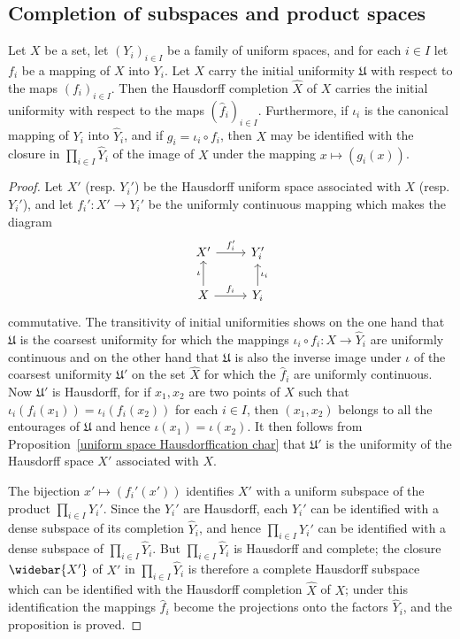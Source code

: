 \subsection{Completion of subspaces and product spaces}
\begin{proposition}\label{uniform space completion of initial topology}
Let $X$ be a set, let $(Y_i)_{i\in I}$ be a family of uniform spaces, and for each $i\in I$ let $f_i$ be a mapping of $X$ into $Y_i$. Let $X$ carry the initial uniformity $\mathfrak{U}$ with respect to the maps $(f_i)_{i\in I}$. Then the Hausdorff completion $\widehat{X}$ of $X$ carries the initial uniformity with respect to the maps $(\hat{f}_i)_{i\in I}$. Furthermore, if $\iota_i$ is the canonical mapping of $Y_i$ into $\widehat{Y}_i$, and if $g_i=\iota_i\circ f_i$, then $X$ may be identified with the closure in $\prod_{i\in I}\widehat{Y}_i$ of the image of $X$ under the mapping $x\mapsto(g_i(x))$.
\end{proposition}
\begin{proof}
Let $X'$ (resp. $Y_i'$) be the Hausdorff uniform space associated with $X$ (resp. $Y_i'$), and let $f_i':X'\to Y_i'$ be the uniformly continuous mapping which makes the diagram
\[\begin{tikzcd}
X'\ar[r,"f_i'"]&Y_i'\\
X\ar[u,"\iota"]\ar[r,"f_i"]&Y_i\ar[u,swap,"\iota_i"]
\end{tikzcd}\]
commutative. The transitivity of initial uniformities shows on the one hand that $\mathfrak{U}$ is the coarsest uniformity for which the mappings $\iota_i\circ f_i:X\to\widehat{Y}_i$ are uniformly continuous and on the other hand that $\mathfrak{U}$ is also the inverse image under $\iota$ of the coarsest uniformity $\mathfrak{U}'$ on the set $\widehat{X}$ for which the $\hat{f}_i$ are uniformly continuous. Now $\mathfrak{U}'$ is Hausdorff, for if $x_1,x_2$ are two points of $X$ such that $\iota_i(f_i(x_1))=\iota_i(f_i(x_2))$ for each $i\in I$, then $(x_1,x_2)$ belongs to all the entourages of $\mathfrak{U}$ and hence $\iota(x_1)=\iota(x_2)$. It then follows from Proposition~\ref{uniform space Hausdorffication char} that $\mathfrak{U}'$ is the uniformity of the Hausdorff space $X'$ associated with $X$.\par
The bijection $x'\mapsto(f_i'(x'))$ identifies $X'$ with a uniform subspace of the product $\prod_{i\in I}Y_i'$. Since the $Y_i'$ are Hausdorff, each $Y_i'$ can be identified with a dense subspace of its completion $\widehat{Y}_i$, and hence $\prod_{i\in I}Y_i'$ can be identified with a dense subspace of $\prod_{i\in I}\widehat{Y}_i$. But $\prod_{i\in I}\widehat{Y}_i$ is Hausdorff and complete; the closure $\widebar{X'}$ of $X'$ in $\prod_{i\in I}\widehat{Y}_i$ is therefore a complete Hausdorff subspace which can be identified with the Hausdorff completion $\widehat{X}$ of $X$; under this identification the mappings $\hat{f}_i$ become the projections onto the factors $\widehat{Y}_i$, and the proposition is proved.
\end{proof}
